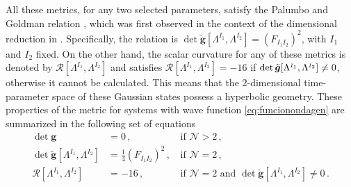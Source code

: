 \documentclass[12pt]{iopart}
\begin{document}
All these metrics, for any two selected parameters, satisfy the Palumbo and Goldman relation \cite{Palumbo}, which was first observed in the context of the dimensional reduction in \cite{Freund, Nepo}. Specifically, the relation is $ \det \tilde{\boldsymbol{g}}[\Lambda^{{\scriptscriptstyle I_1}},\Lambda^{{\scriptscriptstyle I_2}}]= \left(F_{\scriptscriptstyle I_1 I_2}\right)^2$, with $I_1$ and $I_2$ fixed. On the other hand, the scalar curvature for any of these metrics is denoted by $\mathcal{R}[\Lambda^{I_1},\Lambda^{I_2}]$ and satisfies $\mathcal{R}[\Lambda^{I_1},\Lambda^{I_2}]=-16$ if $\det \Tilde{\boldsymbol{g}}[\Lambda^{{\scriptscriptstyle I_1}},\Lambda^{{\scriptscriptstyle I_2}}]\neq 0$, otherwise it cannot be calculated. This means that the 2-dimensional time-parameter space of
these Gaussian states possess a hyperbolic geometry.
These properties of the metric for systems with wave function \eqref{eq:funcionondagen} are summarized in the following set of equations
\begin{subequations}
\begin{align} \displaystyle
    \det \boldsymbol{g}&= 0 \,,  \label{eq:determinante0} \, &\mathrm{if} \, \,  \mathcal{N}>2\,,\\  
   \det\tilde{ \boldsymbol{g}}[ \Lambda^{\scriptscriptstyle I_1},\Lambda^{ \scriptscriptstyle I_2}]&= \frac{1}{4}\left(F_{\scriptscriptstyle I_1 I_2} \right)^2 \,, \,& \mathrm{if} \, \,  \mathcal{N}=2\,,
    \label{eq:palumbo}\\
    \mathcal{R}[\Lambda^{I_1},\Lambda^{I_2}]&=-16  \,, & \mathrm{if} \, \, \mathcal{N}=2\label{eq:curvatura1d} \, \, \mathrm{and} \, \, \det \tilde{\boldsymbol{g}}[\Lambda^{{\scriptscriptstyle I_1}},\Lambda^{{\scriptscriptstyle I_2}}]\neq 0 \,.
\end{align}
\label{eq:propiedadesgenerales}
\end{subequations} 
\end{document}
